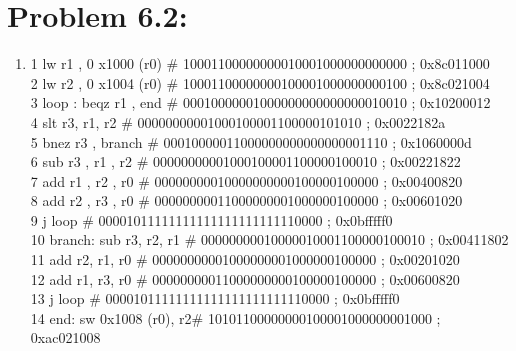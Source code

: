 \documentclass[10pt,a4paper]{article}
\begin{document}
\section*{Problem 6.2:}
\begin{enumerate}
	\item    1 lw r1 , 0 x1000 (r0)    \# 10001100000000010001000000000000 ; 0x8c011000 \\
					 2 lw r2 , 0 x1004 (r0)    \# 10001100000000100001000000000100 ; 0x8c021004 \\
					 3 loop : beqz r1 , end    \# 00010000001000000000000000010010 ; 0x10200012 \\
					 4 slt r3, r1, r2          \# 00000000001000100001100000101010 ; 0x0022182a \\
					 5 bnez r3 , branch        \# 00010000011000000000000000001110 ; 0x1060000d \\
					 6 sub r3 , r1 , r2        \# 00000000001000100001100000100010 ; 0x00221822 \\
					 7 add r1 , r2 , r0        \# 00000000010000000000100000100000 ; 0x00400820 \\
					 8 add r2 , r3 , r0        \# 00000000011000000001000000100000 ; 0x00601020 \\
					 9 j loop                  \# 00001011111111111111111111110000 ; 0x0bfffff0 \\
					 10 branch: sub r3, r2, r1 \# 00000000010000010001100000100010 ; 0x00411802 \\
					 11 add r2, r1, r0         \# 00000000001000000001000000100000 ; 0x00201020 \\
					 12 add r1, r3, r0         \# 00000000011000000000100000100000 ; 0x00600820 \\
					 13 j loop								 \# 00001011111111111111111111110000 ; 0x0bfffff0 \\
					 14 end: sw 0x1008 (r0), r2\# 10101100000000100001000000001000 ; 0xac021008 \\
\end{enumerate}
\end{document}
